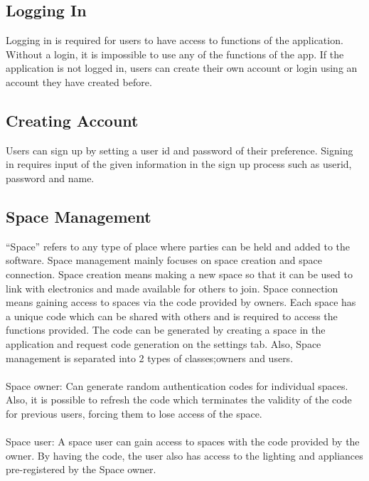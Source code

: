 \documentclass[conference]{IEEEtran}
\begin{document}
    \subsection{Logging In}
    Logging in is required for users to have access to functions of the application. Without a login, it is impossible to use any of the functions of the app. If the application is not logged in, users can create their own account or login using an account they have created before. 
    
    \subsection{Creating Account}
    Users can sign up by setting a user id and password of their preference. Signing in requires input  of the given information in the sign up process such as userid, password and name.
    
    \subsection{Space Management}
    “Space” refers to any type of place where parties can be held and added to the software. Space management mainly focuses on space creation and space connection. Space creation means making a new space so that it can be used to link with electronics and made available for others to join. Space connection means gaining access to spaces via the code provided by owners. Each space has a unique code which can be shared with others and is required to access the functions provided. The code can be generated by creating a space in the application and request code generation on the settings tab. Also, Space management is separated into 2 types of classes;owners and users.\\ \\
    Space owner: Can generate random authentication codes for individual spaces. Also, it is possible to refresh the code which terminates the validity of the code for previous users, forcing them to lose access of the space.\\ \\
    Space user: A space user can gain access to spaces with the code provided by the owner. By having the code, the user also has access to the lighting and appliances pre-registered by the Space owner.
\end{document}
